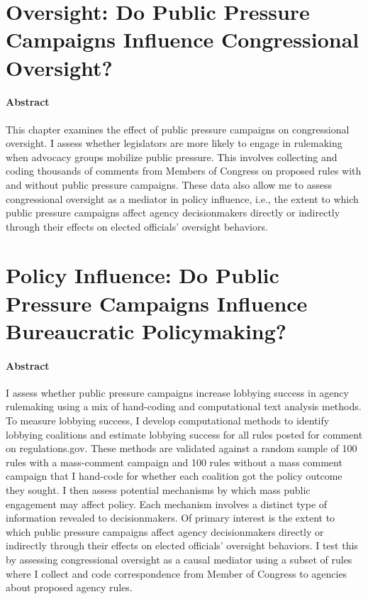 \documentclass[
]{book}
\begin{document}
\hypertarget{oversight-do-public-pressure-campaigns-influence-congressional-oversight}{%
\chapter{Oversight: Do Public Pressure Campaigns Influence Congressional Oversight?}\label{oversight-do-public-pressure-campaigns-influence-congressional-oversight}}

\hypertarget{abstract-2}{%
\subsubsection*{Abstract}\label{abstract-2}}

This chapter examines the effect of public pressure campaigns on congressional oversight. I assess whether legislators are more likely to engage in rulemaking when advocacy groups mobilize public pressure. This involves collecting and coding thousands of comments from Members of Congress on proposed rules with and without public pressure campaigns. These data also allow me to assess congressional oversight as a mediator in policy influence, i.e., the extent to which public pressure campaigns affect agency decisionmakers directly or indirectly through their effects on elected officials' oversight behaviors.

\hypertarget{policy-influence-do-public-pressure-campaigns-influence-bureaucratic-policymaking}{%
\chapter{Policy Influence: Do Public Pressure Campaigns Influence Bureaucratic Policymaking?}\label{policy-influence-do-public-pressure-campaigns-influence-bureaucratic-policymaking}}

\hypertarget{abstract-3}{%
\subsubsection*{Abstract}\label{abstract-3}}

I assess whether public pressure campaigns increase lobbying success in agency rulemaking using a mix of hand-coding and computational text analysis methods. To measure lobbying success, I develop computational methods to identify lobbying coalitions and estimate lobbying success for all rules posted for comment on regulations.gov. These methods are validated against a random sample of 100 rules with a mass-comment campaign and 100 rules without a mass comment campaign that I hand-code for whether each coalition got the policy outcome they sought. I then assess potential mechanisms by which mass public engagement may affect policy. Each mechanism involves a distinct type of information revealed to decisionmakers. Of primary interest is the extent to which public pressure campaigns affect agency decisionmakers directly or indirectly through their effects on elected officials' oversight behaviors. I test this by assessing congressional oversight as a causal mediator using a subset of rules where I collect and code correspondence from Member of Congress to agencies about proposed agency rules.
\end{document}
